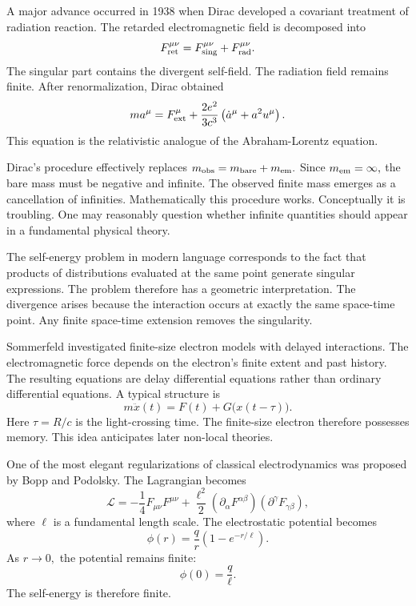 A major advance occurred in 1938 when Dirac developed a covariant 
treatment of radiation reaction.
The retarded electromagnetic field is decomposed into
\begin{equation}
    \label{retfield}
F^{\mu\nu}_{\rm ret} = F^{\mu\nu}_{\rm sing}+F^{\mu\nu}_{\rm rad}.
\end{equation}
The singular part contains the divergent self-field.
The radiation field remains finite.
After renormalization, Dirac obtained
\begin{equation}
    \label{dal-eq}
m a^\mu = F^\mu_{\rm ext}+\frac{2e^2}{3c^3}
\left(\dot a^\mu+a^2u^\mu \right).
\end{equation}
This equation is the relativistic analogue of the Abraham-Lorentz equation.

Dirac's procedure effectively replaces
$m_{\rm obs} = m_{\rm bare}+m_{\rm em}.$
Since $m_{\rm em} = \infty,$
the bare mass must be negative and infinite.
The observed finite mass emerges as a cancellation of infinities.
Mathematically this procedure works.
Conceptually it is troubling.
One may reasonably question whether infinite quantities should appear in 
a fundamental physical theory.

The self-energy problem in modern language
corresponds to
the fact that products of distributions evaluated at the same point 
generate singular expressions.
The problem therefore has a geometric interpretation.
The divergence arises because the interaction occurs at exactly the 
same space-time point.
Any finite space-time extension removes the singularity.

Sommerfeld investigated finite-size electron models with delayed 
interactions.
The electromagnetic force depends on the electron's finite extent 
and past history.
The resulting equations are delay differential equations rather than ordinary differential equations.
A typical structure is
\begin{equation}
    \label{som-eq}
m\ddot x(t) = F(t)+G\bigl(x(t-\tau)\bigr).
\end{equation}
Here $ \tau=R/c $ is the light-crossing time.
The finite-size electron therefore possesses memory.
This idea anticipates later non-local theories.

One of the most elegant regularizations of classical electrodynamics was 
proposed by Bopp and Podolsky.
The Lagrangian becomes
\begin{equation}
    \label{bp-lag}
    \mathcal L = -\frac{1}{4}F_{\mu\nu}F^{\mu\nu}
+\frac{\ell^2}{2}
(\partial_\alpha F^{\alpha\beta})
(\partial^\gamma F_{\gamma\beta}),
\end{equation}
where $\ell$ is a fundamental length scale.
The electrostatic potential becomes
\begin{equation}
    \label{bp-pot}
\phi(r) = \frac{q}{r}
\left(1-e^{-r/\ell}\right).
\end{equation}
As $r \rightarrow 0,  $
the potential remains finite:
\[\phi(0) = \frac{q}{\ell}.\]
The self-energy is therefore finite.

